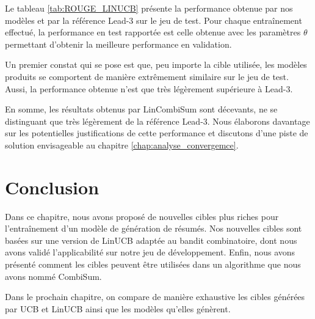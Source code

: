 Le tableau \ref{tab:ROUGE_LINUCB} présente la performance 
obtenue par nos modèles et par la référence Lead-3 sur le jeu de test.
Pour chaque entraînement effectué, la performance en test 
rapportée est celle obtenue avec les paramètres $\theta$
permettant d'obtenir la meilleure performance en validation.

\begin{table}[!h]
    \centering
    \def\arraystretch{1.8}
    \caption{Performance sur le jeu de test.}
    \label{tab:ROUGE_LINUCB}
\end{table}

Un premier constat qui se pose est que, peu importe la cible 
utilisée, les modèles produits se comportent de manière 
extrêmement similaire sur le jeu de test.
Aussi, la performance obtenue n'est que 
très légèrement supérieure à Lead-3.

En somme, les résultats obtenus par LinCombiSum sont décevants,
ne se distinguant que très légèrement de la référence Lead-3.
Nous élaborons davantage sur les potentielles 
justifications de cette performance et discutons 
d'une piste de solution envisageable au chapitre \ref{chap:analyse_convergemce}.

\section{Conclusion}

Dans ce chapitre, nous avons proposé de nouvelles cibles plus riches
pour l'entraînement d'un modèle de génération de résumés.
Nos nouvelles cibles sont basées sur une version 
de LinUCB adaptée au bandit combinatoire, dont nous avons validé 
l'applicabilité sur notre jeu de développement.
Enfin, nous avons présenté comment les cibles 
peuvent être utilisées dans un algorithme 
que nous avons nommé CombiSum.

Dans le prochain chapitre, on compare 
de manière exhaustive les cibles 
générées par UCB et LinUCB ainsi que les modèles 
qu'elles génèrent.